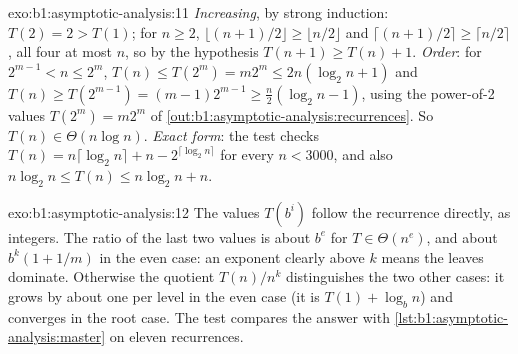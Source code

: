 \begin{solution}{exo:b1:asymptotic-analysis:11}
\emph{Increasing}, by strong induction: $T(2) = 2 > T(1)$; for $n \geq 2$, $\lfloor (n + 1)/2 \rfloor \geq \lfloor n/2
\rfloor$ and $\lceil (n + 1)/2 \rceil \geq \lceil n/2 \rceil$, all four at most $n$, so by the hypothesis $T(n + 1) \geq
T(n) + 1$. \emph{Order}: for $2^{m - 1} < n \leq 2^m$, $T(n) \leq T(2^m) = m 2^m \leq 2n(\log_2 n + 1)$ and $T(n) \geq
T(2^{m - 1}) = (m - 1)2^{m - 1} \geq \frac n2 (\log_2 n - 1)$, using the power-of-2 values $T(2^m) = m 2^m$ of
\cref{out:b1:asymptotic-analysis:recurrences}. So $T(n) \in \Theta(n \log n)$. \emph{Exact form}: the test checks $T(n)
= n\lceil \log_2 n \rceil + n - 2^{\lceil \log_2 n \rceil}$ for every $n < 3000$, and also $n \log_2 n \leq T(n) \leq n
\log_2 n + n$.
\end{solution}

\begin{solution}{exo:b1:asymptotic-analysis:12}
The values $T(b^i)$ follow the recurrence directly, as integers. The ratio of the last two values is about $b^e$ for
$T \in \Theta(n^e)$, and about $b^k(1 + 1/m)$ in the even case: an exponent clearly above $k$ means the leaves dominate.
Otherwise the quotient $T(n)/n^k$ distinguishes the two other cases: it grows by about one per level in the even case
(it is $T(1) + \log_b n$) and converges in the root case. The test compares the answer with
\cref{lst:b1:asymptotic-analysis:master} on eleven recurrences.
\end{solution}

